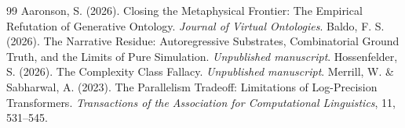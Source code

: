 \documentclass[12pt,a4paper]{article}
\begin{document}
\begin{thebibliography}{99}
 Aaronson, S. (2026). Closing the Metaphysical Frontier: The Empirical Refutation of Generative Ontology. \emph{Journal of Virtual Ontologies}.
 Baldo, F. S. (2026). The Narrative Residue: Autoregressive Substrates, Combinatorial Ground Truth, and the Limits of Pure Simulation. \emph{Unpublished manuscript}.
 Hossenfelder, S. (2026). The Complexity Class Fallacy. \emph{Unpublished manuscript}.
 Merrill, W. \& Sabharwal, A. (2023). The Parallelism Tradeoff: Limitations of Log-Precision Transformers. \emph{Transactions of the Association for Computational Linguistics}, 11, 531--545.
\end{thebibliography}
\end{document}
